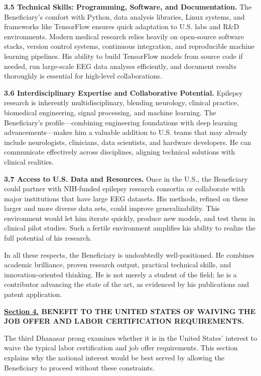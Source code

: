 \documentclass{article}
\begin{document}
{\bf 3.5 Technical Skills: Programming, Software, and Documentation.}
The Beneficiary’s comfort with Python, data analysis libraries, Linux systems, and frameworks like TensorFlow ensures quick adaptation to U.S. labs and R\&D environments. Modern medical research relies heavily on open-source software stacks, version control systems, continuous integration, and reproducible machine learning pipelines. His ability to build TensorFlow models from source code if needed, run large-scale EEG data analyses efficiently, and document results thoroughly is essential for high-level collaborations.


{\bf 3.6 Interdisciplinary Expertise and Collaborative Potential.}
Epilepsy research is inherently multidisciplinary, blending neurology, clinical practice, biomedical engineering, signal processing, and machine learning. The Beneficiary’s profile—combining engineering foundations with deep learning advancements—makes him a valuable addition to U.S. teams that may already include neurologists, clinicians, data scientists, and hardware developers. He can communicate effectively across disciplines, aligning technical solutions with clinical realities.

{\bf 3.7 Access to U.S. Data and Resources.}
Once in the U.S., the Beneficiary could partner with NIH-funded epilepsy research consortia or collaborate with major institutions that have large EEG datasets. His methods, refined on these larger and more diverse data sets, could improve generalizability. This environment would let him iterate quickly, produce new models, and test them in clinical pilot studies. Such a fertile environment amplifies his ability to realize the full potential of his research.

In all these respects, the Beneficiary is undoubtedly well-positioned. He combines academic brilliance, proven research output, practical technical skills, and innovation-oriented thinking. He is not merely a student of the field; he is a contributor advancing the state of the art, as evidenced by his publications and patent application.


\clearpage

{\bf \underline{Section 4.} BENEFIT TO THE UNITED STATES OF WAIVING THE JOB OFFER AND LABOR CERTIFICATION REQUIREMENTS. }

The third Dhanasar prong examines whether it is in the United States’ interest to waive the typical labor certification and job offer requirements. This section explains why the national interest would be best served by allowing the Beneficiary to proceed without these constraints.
\end{document}
